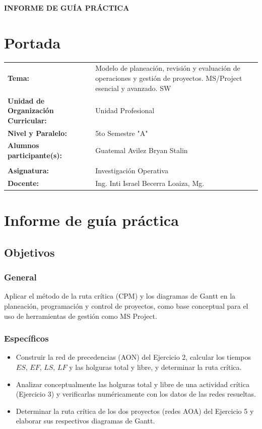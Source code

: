 \documentclass{article}
\begin{document}
\begin{center}
    {\large \textbf{INFORME DE GUÍA PRÁCTICA}} \\
\end{center}

\section{Portada}
\begin{flushleft}
\begin{tabular}{ l p{8.3cm} }
    \textbf{Tema:} & Modelo de planeación, revisión y evaluación de operaciones y gestión de proyectos. MS/Project esencial y avanzado. SW \\
    \textbf{Unidad de Organización Curricular:} & Unidad Profesional \\
    \textbf{Nivel y Paralelo:} & 5to Semestre "A" \\
    \textbf{Alumnos participante(s):} & Guatemal Avilez Bryan Stalin\\
    & \dotfill \\
    \textbf{Asignatura:} & Investigación Operativa \\
    \textbf{Docente:} & Ing. Inti Israel Becerra Loaiza, Mg. \\
\end{tabular}
\end{flushleft}

\section{Informe de guía práctica}
\subsection{Objetivos}
\subsubsection{General}
Aplicar el método de la ruta crítica (CPM) y los diagramas de Gantt en la planeación, programación y control de proyectos, como base conceptual para el uso de herramientas de gestión como MS Project.

\subsubsection{Específicos}
\begin{itemize}
    \item Construir la red de precedencias (AON) del Ejercicio 2, calcular los tiempos $ES$, $EF$, $LS$, $LF$ y las holguras total y libre, y determinar la ruta crítica.
    \item Analizar conceptualmente las holguras total y libre de una actividad crítica (Ejercicio 3) y verificarlas numéricamente con los datos de las redes resueltas.
    \item Determinar la ruta crítica de los dos proyectos (redes AOA) del Ejercicio 5 y elaborar sus respectivos diagramas de Gantt.
\end{itemize}
\end{document}
